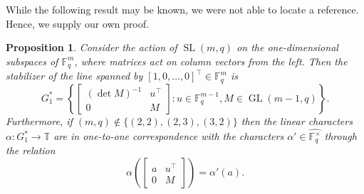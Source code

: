 \documentclass[11pt]{article}
\newtheorem{proposition}[theo]{Proposition}
\theoremstyle{definition}
\numberwithin{equation}{section}
\begin{document}
While the following result may be known, we were not able to locate a reference.
Hence, we supply our own proof.


\begin{proposition}
\label{prop.SL stabilizer}
Consider the action of $\operatorname{SL}(m,q)$ on the one-dimensional subspaces of $\mathbb{F}_q^m$, where matrices act on column vectors from the left.
Then the stabilizer of the line spanned by $[1,0,\ldots,0]^\top\in\mathbb{F}_q^m$ is
\[
G^*_1
=\left\{
\begin{bmatrix}
(\det M)^{-1}&u^\top\\0&M
\end{bmatrix}
: u\in\mathbb{F}_q^{m-1},M\in\operatorname{GL}(m-1,q)
\right\}.
\]
Furthermore, if $(m,q) \notin \{(2,2),(2,3), (3,2)\}$ then the linear characters $\alpha \colon G_1^* \to \mathbb{T}$ are in one-to-one correspondence with the characters $\alpha' \in\widehat{\mathbb{F}_q^\times}$ through the relation
\[
\alpha\left(\begin{bmatrix}
a&u^\top\\0&M
\end{bmatrix}\right)
=\alpha'(a).
\]
\end{proposition}
\end{document}
